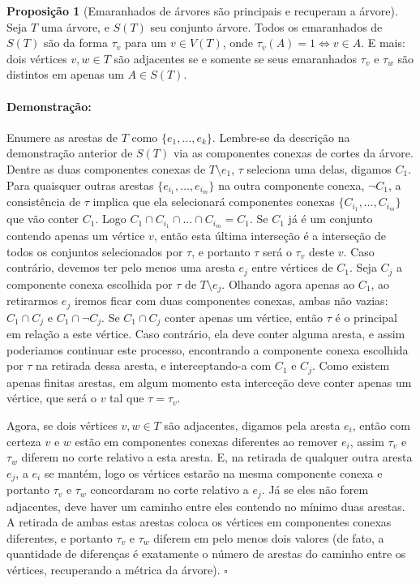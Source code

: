 \documentclass[11pt]{article}
\newcommand{\pulinho}{\vspace{.5cm}}
\theoremstyle{definition}
\theoremstyle{definition}
\theoremstyle{definition}
\newtheorem{prop}{Proposição}
\newenvironment{proposicao}{
\definecolor{shadecolor}{HTML}{FFDBDF}
\begin{shaded}
\begin{prop}
}
{
\end{prop}
\end{shaded}
}
\theoremstyle{definition}
\theoremstyle{definition}
\theoremstyle{definition}
\theoremstyle{definition}
\theoremstyle{definition}
\theoremstyle{definition}
\theoremstyle{definition}
\theoremstyle{definition}
\theoremstyle{definition}
\newenvironment{prova}{\paragraph{Demonstração:}}{\hfill$\square$ 
\pulinho
}
\theoremstyle{definition}
\begin{document}
\begin{proposicao}[Emaranhados de árvores são principais e recuperam a árvore]
  Seja $T$ uma árvore, e $S(T)$ seu conjunto árvore. Todos os emaranhados de $S(T)$ são da forma $\tau_v$ para um $v \in V(T)$, onde $\tau_v(A) = 1 \Leftrightarrow v \in A$. E mais: dois vértices $v,w \in T$ são adjacentes se e somente se seus emaranhados $\tau_v$ e $\tau_w$ são distintos em apenas um $A \in S(T)$.
\end{proposicao}
\begin{prova}
Enumere as arestas de $T$ como $\{e_1,\dots, e_k\}$. Lembre-se da descrição na demonstração anterior de $S(T)$ via as componentes conexas de cortes da árvore. Dentre as duas componentes conexas de $T \setminus e_1$, $\tau$ seleciona uma delas, digamos $C_1$. Para quaisquer outras arestas $\{e_{i_1}, \dots, e_{i_m}\}$ na outra componente conexa, $\lnot C_1$, a consistência de $\tau$ implica que ela selecionará componentes conexas $\{C_{i_1}, \dots, C_{i_m}\}$ que vão conter $C_1$. Logo $C_1 \cap C_{i_1} \cap \dots \cap C_{i_m} = C_1$. Se $C_1$ já é um conjunto contendo apenas um vértice $v$, então esta última interseção é a interseção de todos os conjuntos selecionados por $\tau$, e portanto $\tau$ será o $\tau_v$ deste $v$. Caso contrário, devemos ter pelo menos uma aresta $e_j$ entre vértices de $C_1$. Seja $C_j$ a componente conexa escolhida por $\tau$ de $T \setminus e_j$. Olhando agora apenas ao $C_1$, ao retirarmos $e_j$ iremos ficar com duas componentes conexas, ambas não vazias: $C_1 \cap C_j$ e $C_1 \cap \lnot C_j$. Se $C_1 \cap C_j$ conter apenas um vértice, então $\tau$ é o principal em relação a este vértice. Caso contrário, ela deve conter alguma aresta, e assim poderiamos continuar este processo, encontrando a componente conexa escolhida por $\tau$ na retirada dessa aresta, e interceptando-a com $C_1$ e $C_j$. Como existem apenas finitas arestas, em algum momento esta interceção deve conter apenas um vértice, que será o $v$ tal que $\tau = \tau_v$.

Agora, se dois vértices $v,w \in T$ são adjacentes, digamos pela aresta $e_i$, então com certeza $v$ e $w$ estão em componentes conexas diferentes ao remover $e_i$, assim $\tau_v$ e $\tau_w$ diferem no corte relativo a esta aresta. E, na retirada de qualquer outra aresta $e_j$, a $e_i$ se mantém, logo os vértices estarão na mesma componente conexa e portanto $\tau_v$ e $\tau_w$ concordaram no corte relativo a $e_j$. Já se eles não forem adjacentes, deve haver um caminho entre eles contendo no mínimo duas arestas. A retirada de ambas estas arestas coloca os vértices em componentes conexas diferentes, e portanto $\tau_v$ e $\tau_w$ diferem em pelo menos dois valores (de fato, a quantidade de diferenças é exatamente o número de arestas do caminho entre os vértices, recuperando a métrica da árvore).
\end{prova}
\end{document}
